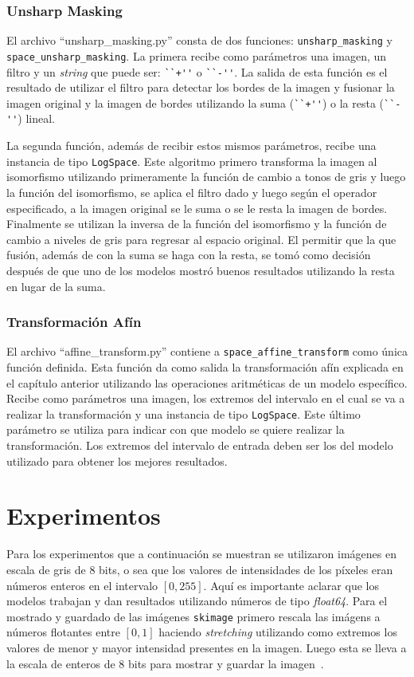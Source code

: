\subsubsection{Unsharp Masking}

El archivo ``unsharp\_masking.py'' consta de dos funciones: \verb|unsharp_masking| y \verb|space_unsharp_masking|. La primera recibe como par\'ametros una imagen, un filtro y un \textit{string} que puede ser: \verb|``+''| o \verb|``-''|. La salida de esta funci\'on es el resultado de utilizar el filtro para detectar los bordes de la imagen y fusionar la imagen original y la imagen de bordes utilizando la suma (\verb|``+''|) o la resta (\verb|``-''|) lineal. 

La segunda funci\'on, adem\'as de recibir estos mismos par\'ametros, recibe una instancia de tipo \verb|LogSpace|. Este algoritmo primero transforma la imagen al isomorfismo utilizando primeramente la funci\'on de cambio a tonos de gris y luego la funci\'on del isomorfismo, se aplica el filtro dado y luego seg\'un el operador especificado, a la imagen original se le suma o se le resta la imagen de bordes. Finalmente se utilizan la inversa de la funci\'on del isomorfismo y la funci\'on de cambio a niveles de gris para regresar al espacio original. El permitir que la que fusi\'on, adem\'as de con la suma se haga con la resta, se tom\'o como decisi\'on despu\'es de que uno de los modelos mostr\'o buenos resultados utilizando la resta en lugar de la suma. 

\subsubsection{Transformaci\'on Af\'in}

El archivo ``affine\_transform.py'' contiene a \verb|space_affine_transform| como \'unica funci\'on definida. Esta funci\'on da como salida la transformaci\'on af\'in explicada en el cap\'itulo anterior utilizando las operaciones aritm\'eticas de un modelo espec\'ifico. Recibe como par\'ametros una imagen, los extremos del intervalo en el cual se va a realizar la transformaci\'on y una instancia de tipo \verb|LogSpace|. Este \'ultimo par\'ametro se utiliza para indicar con que modelo se quiere realizar la transformaci\'on. Los extremos del intervalo de entrada deben ser los del modelo utilizado para obtener los mejores resultados.

\section{Experimentos}
Para los experimentos que a continuaci\'on se muestran se utilizaron im\'agenes en escala de gris de 8 bits, o sea que los valores de intensidades de los p\'ixeles eran n\'umeros enteros en el intervalo $[0,255]$. Aqu\'i es importante aclarar que los modelos trabajan y dan resultados utilizando n\'umeros de tipo \textit{float64}. Para el mostrado y guardado de las im\'agenes \verb|skimage| primero rescala las im\'agens a n\'umeros flotantes entre $[0,1]$ haciendo \textit{stretching} utilizando como extremos los valores de menor y mayor intensidad presentes en la imagen. Luego esta se lleva a la escala de enteros de 8 bits para mostrar y guardar la imagen~\cite{image_data_types_and_what_they_mean}.


